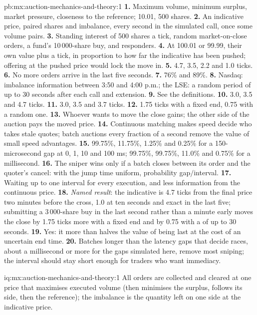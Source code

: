 \begin{solution}{pb:mx:auction-mechanics-and-theory:1}
\textbf{1.} Maximum volume, minimum surplus, market pressure, closeness to the reference; 10.01, 500 shares.
\textbf{2.} An indicative price, paired shares and imbalance, every second in the simulated call, once some volume pairs.
\textbf{3.} Standing interest of 500 shares a tick, random market-on-close orders, a fund's 10\,000-share buy, and responders.
\textbf{4.} At 100.01 or 99.99, their own value plus a tick, in proportion to how far the indicative has been pushed; offering at the pushed price would
lock the move in.
\textbf{5.} 4.7, 3.5, 2.2 and 1.0 ticks.
\textbf{6.} No more orders arrive in the last five seconds.
\textbf{7.} 76\% and 89\%.
\textbf{8.} Nasdaq: imbalance information between 3:50 and 4:00 p.m.; the LSE: a random period of up to 30 seconds after each call and extension.
\textbf{9.} See the definitions.
\textbf{10.} 3.0, 3.5 and 4.7 ticks.
\textbf{11.} 3.0, 3.5 and 3.7 ticks.
\textbf{12.} 1.75 ticks with a fixed end, 0.75 with a random one.
\textbf{13.} Whoever wants to move the close gains; the other side of the auction pays the moved price.
\textbf{14.} Continuous matching makes speed decide who takes stale quotes; batch auctions every fraction of a second remove the value of small speed
advantages.
\textbf{15.} 99.75\%, 11.75\%, 1.25\% and 0.25\% for a 150-microsecond gap at 0, 1, 10 and 100 ms; 99.75\%, 99.75\%, 11.0\% and 0.75\% for a millisecond.
\textbf{16.} The sniper wins only if a batch closes between its order and the quoter's cancel: with the jump time uniform, probability gap$/$interval.
\textbf{17.} Waiting up to one interval for every execution, and less information from the continuous price.
\textbf{18.} \emph{Named result}: the indicative is 4.7 ticks from the final price two minutes before the cross, 1.0 at ten seconds and exact in the last
five; submitting a 3\,000-share buy in the last second rather than a minute early moves the close by 1.75 ticks more with a fixed end and by 0.75 with a
 of up to 30 seconds.
\textbf{19.} Yes: it more than halves the value of being last at the cost of an uncertain end time.
\textbf{20.} Batches longer than the latency gaps that decide races, about a millisecond or more for the gaps simulated here, remove most sniping; the
interval should stay short enough for traders who want immediacy.
\end{solution}

\begin{solution}{iq:mx:auction-mechanics-and-theory:1}
All orders are collected and cleared at one price that maximises executed volume (then minimises the surplus, follows its side, then the reference); the
imbalance is the quantity left on one side at the indicative price.
\end{solution}

